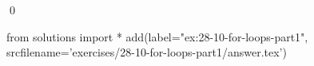 
\begin{ex}
  \label{ex:28-10-for-loops-part1}
  
  \qed
\end{ex}
\begin{python0}
from solutions import *
add(label="ex:28-10-for-loops-part1",
    srcfilename='exercises/28-10-for-loops-part1/answer.tex')
\end{python0}
